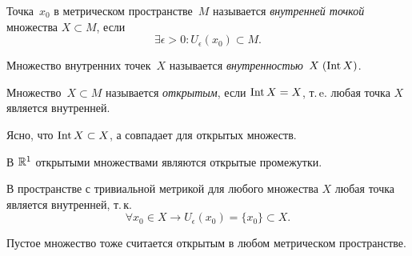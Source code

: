 
\begin{definition}
Точка~\(x_0\) в метрическом пространстве~\(M\) называется \textit{внутренней точкой} множества \(X
\subset M\), если
\[
    \exists \epsilon > 0 \colon U_\epsilon(x_0) \subset M.
\]
\end{definition}

\begin{definition}
Множество внутренних точек~\(X\) называется \textit{внутренностью}~\(X \; (\operatorname{Int} X)\).
\end{definition}

\begin{definition}
Множество~\(X \subset M\) называется \textit{открытым}, если \(\operatorname{Int} X = X\), т.\,e. любая точка
\(X\) является внутренней.
\end{definition}

Ясно, что \(\operatorname{Int} X \subset X\), а совпадает для открытых множеств.

\begin{examples}
В \(\mathbb{R}^1\) открытыми множествами являются открытые промежутки.

В пространстве с тривиальной метрикой для любого множества \(X\) любая точка является внутренней,
т.\,к.
\[
    \forall x_0 \in X \rightarrow U_\epsilon (x_0) = \{x_0\} \subset X.
\]
\end{examples}

\begin{note}
Пустое множество тоже считается открытым в любом метрическом пространстве.
\end{note}